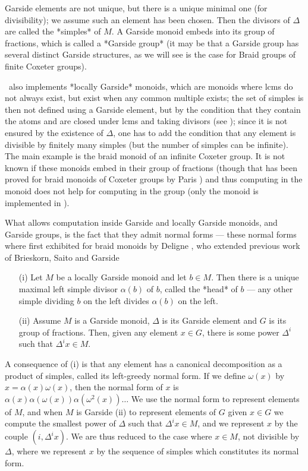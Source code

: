 Garside  elements are not  unique, but there  is a unique  minimal one (for
divisibility); we assume such an element has been chosen. Then the divisors
of  $\Delta$ are called the *simples* of  $M$. A Garside monoid embeds into
its group of fractions, which is called a *Garside group* (it may be that a
Garside  group has several  distinct Garside structures,  as we will see is
the case for Braid groups of finite Coxeter groups).

\CHEVIE\ also implements *locally Garside* monoids, which are monoids where
lcms  do not always exist,  but exist when any  common multiple exists; the
set  of simples  is then  not defined  using a  Garside element, but by the
condition  that they contain the atoms and are closed under lcms and taking
divisors  (see \cite{BDM01}); since  it is not  ensured by the existence of
$\Delta$,  one has to  add the condition  that any element  is divisible by
finitely many simples (but the number of simples can be infinite). The main
example  is the braid monoid of an  infinite Coxeter group. It is not known
if  these monoids embed in  their group of fractions  (though that has been
proved  for braid  monoids of  Coxeter groups  by Paris \cite{Paris01}) and
thus computing in the monoid does not help for computing in the group (only
the monoid is implemented in \CHEVIE).

What  allows computation  inside Garside  and locally  Garside monoids, and
Garside  groups, is the fact that they  admit normal forms --- these normal
forms  where first exhibited for braid monoids by Deligne \cite{Del72}, who
extended   previous  work  of  Brieskorn,  Saito  \cite{BS72}  and  Garside
\cite{Gar69}\:

\begin{enumerate}
\item[(i)]
Let  $M$ be  a locally  Garside monoid  and let  $b\in M$.  Then there is a
unique maximal left simple divisor $\alpha(b)$ of $b$, called the *head* of
$b$  --- any other simple  dividing $b$ on the  left divides $\alpha(b)$ on
the left.
\item[(ii)]
Assume  $M$ is a Garside monoid, $\Delta$ is its Garside element and $G$ is
its  group of fractions.  Then, given any  element $x\in G$,  there is some
power $\Delta^i$ such that $\Delta^i x\in M$.
\end{enumerate}

A consequence of (i) is that any element has a canonical decomposition as a
product  of  simples,  called  its  left-greedy  normal  form. If we define
$\omega(x)$  by  $x=\alpha(x)\omega(x)$,  then  the  normal  form of $x$ is
$\alpha(x)\alpha(\omega(x))\alpha(\omega^2(x))\ldots$  We  use  the  normal
form  to  represent  elements  of  $M$,  and  when  $M$  is Garside (ii) to
represent elements of $G$\: given $x\in G$ we compute the smallest power of
$\Delta$  such that $\Delta^i x\in  M$, and we represent  $x$ by the couple
$(i,\Delta^i  x)$. We  are thus  reduced to  the case  where $x\in  M$, not
divisible  by $\Delta$, where  we represent $x$  by the sequence of simples
which constitutes its normal form.

